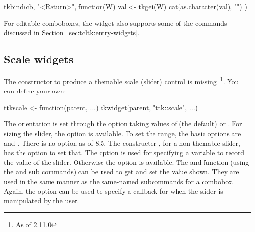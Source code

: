 \begin{Schunk}
\begin{Sinput}
 tkbind(cb, "<Return>", function(W) {
   val <- tkget(W)
   cat(as.character(val), "\n")
 })
\end{Sinput}
\end{Schunk}

For editable comboboxes, the widget also supports some of the
 commands discussed in
Section~\ref{sec:tcltk:entry-widgets}.






\subsection{Scale widgets}
\label{sec:tcltk:scale-widgets}

The  constructor to produce a themable scale
(slider) control is missing~\footnote{As of \R{} 2.11.0}. You can define your own:
\begin{Schunk}
\begin{Sinput}
 ttkscale <- function(parent, ...) tkwidget(parent, "ttk::scale", ...)
\end{Sinput}
\end{Schunk}

The orientation is set through the option 
taking values of  (the default) or
. For sizing the slider, the 
option is available.  To set the range, the basic options are
 and . There is no  option as of \TK\/ 8.5. The constructor
, for a non-themable slider, has the option
 to set that. The
 option is used for specifying a \TCL\/
variable to record the value of the slider. Otherwise the
 option is available.  The  and  function (using the 
 and  sub commands)
can be used to get and set the value shown. They are used in the same
manner as the same-named subcommands for a combobox. Again, the
 option can be used to specify a callback
for when the slider is manipulated by the user.


